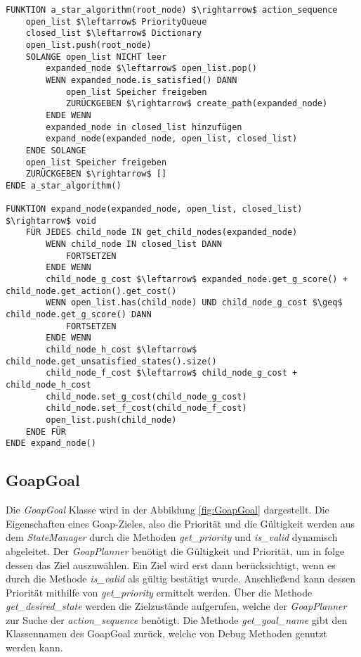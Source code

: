 \begin{lstlisting}[language=Pseudo, caption={a\_star\_algorithm Methode}, mathescape=true, label={lst:pseudo astar}]
FUNKTION a_star_algorithm(root_node) $\rightarrow$ action_sequence
	open_list $\leftarrow$ PriorityQueue
	closed_list $\leftarrow$ Dictionary
	open_list.push(root_node)
	SOLANGE open_list NICHT leer
		expanded_node $\leftarrow$ open_list.pop()
		WENN expanded_node.is_satisfied() DANN
			open_list Speicher freigeben
			ZURÜCKGEBEN $\rightarrow$ create_path(expanded_node)
		ENDE WENN
		expanded_node in closed_list hinzufügen
		expand_node(expanded_node, open_list, closed_list)
	ENDE SOLANGE
	open_list Speicher freigeben
	ZURÜCKGEBEN $\rightarrow$ []
ENDE a_star_algorithm()

FUNKTION expand_node(expanded_node, open_list, closed_list) $\rightarrow$ void
	FÜR JEDES child_node IN get_child_nodes(expanded_node)
		WENN child_node IN closed_list DANN
			FORTSETZEN
		ENDE WENN
		child_node_g_cost $\leftarrow$ expanded_node.get_g_score() + child_node.get_action().get_cost()
		WENN open_list.has(child_node) UND child_node_g_cost $\geq$ child_node.get_g_score() DANN
			FORTSETZEN
		ENDE WENN
		child_node_h_cost $\leftarrow$ child_node.get_unsatisfied_states().size()
		child_node_f_cost $\leftarrow$ child_node_g_cost + child_node_h_cost
		child_node.set_g_cost(child_node_g_cost)
		child_node.set_f_cost(child_node_f_cost)
		open_list.push(child_node)
	ENDE FÜR
ENDE expand_node()
\end{lstlisting}





\subsection{GoapGoal}
\label{chap:goapgoal uml}

Die \textit{GoapGoal} Klasse wird in der Abbildung \ref{fig:GoapGoal} dargestellt. Die Eigenschaften eines Goap-Zieles, also die Priorität und die Gültigkeit werden aus dem \textit{StateManager} durch die Methoden \textit{get\_priority} und \textit{is\_valid} dynamisch abgeleitet. Der \textit{GoapPlanner} benötigt die Gültigkeit und Priorität, um in folge dessen das Ziel auszuwählen. Ein Ziel wird erst dann berücksichtigt, wenn es durch die Methode \textit{is\_valid} als gültig bestätigt wurde. Anschlie\ss{}end kann dessen Priorität mithilfe von \textit{get\_priority} ermittelt werden. \"{U}ber die Methode \textit{get\_desired\_state} werden die Zielzustände aufgerufen, welche der \textit{GoapPlanner} zur Suche der \textit{action\_sequence} benötigt. Die Methode \textit{get\_goal\_name} gibt den Klassennamen des GoapGoal zurück, welche von Debug Methoden genutzt werden kann.

